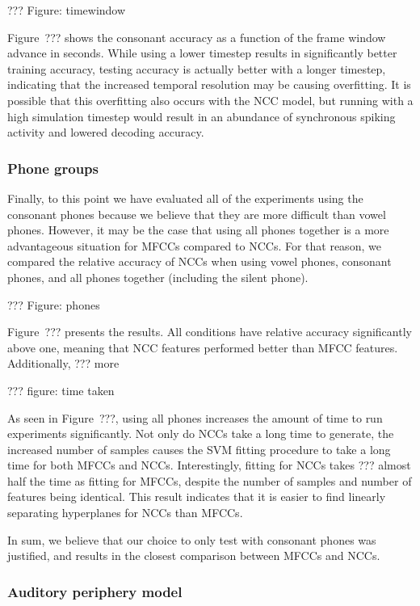 ??? Figure: timewindow

Figure~??? shows the consonant accuracy
as a function of the
frame window advance in seconds.
While using a lower timestep results in
significantly better training accuracy,
testing accuracy is actually better
with a longer timestep,
indicating that the increased temporal
resolution may be causing overfitting.
It is possible that this overfitting
also occurs with the NCC model,
but running with a high simulation timestep
would result in an abundance of
synchronous spiking activity
and lowered decoding accuracy.

\subsubsection{Phone groups}

Finally, to this point we have
evaluated all of the experiments using
the consonant phones
because we believe that they are
more difficult than vowel phones.
However, it may be the case that
using all phones together
is a more advantageous situation
for MFCCs compared to NCCs.
For that reason,
we compared the relative accuracy
of NCCs when using
vowel phones, consonant phones,
and all phones together
(including the silent phone).

??? Figure: phones

Figure~??? presents the results.
All conditions have relative accuracy
significantly above one,
meaning that NCC features performed
better than MFCC features.
Additionally, ??? more

??? figure: time taken

As seen in Figure~???,
using all phones increases the
amount of time to run experiments significantly.
Not only do NCCs take a long time to generate,
the increased number of samples
causes the SVM fitting procedure
to take a long time
for both MFCCs and NCCs.
Interestingly, fitting for NCCs
takes ??? almost half
the time as fitting for MFCCs,
despite the number of samples
and number of features being identical.
This result indicates that it is
easier to find linearly separating hyperplanes
for NCCs than MFCCs.

In sum, we believe that our choice to
only test with consonant phones
was justified,
and results in the closest
comparison between MFCCs and NCCs.

\subsubsection{Auditory periphery model}

